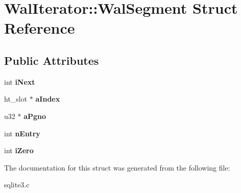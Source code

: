 \hypertarget{struct_wal_iterator_1_1_wal_segment}{\section{Wal\-Iterator\-:\-:Wal\-Segment Struct Reference}
\label{struct_wal_iterator_1_1_wal_segment}
}
\subsection*{Public Attributes}
\begin{DoxyCompactItemize}
\item 
\hypertarget{struct_wal_iterator_1_1_wal_segment_a329c939b196f907fe98cf762bb07d291}{int {\bfseries i\-Next}}\label{struct_wal_iterator_1_1_wal_segment_a329c939b196f907fe98cf762bb07d291}

\item 
\hypertarget{struct_wal_iterator_1_1_wal_segment_adec397836a127acafcc551cb1fdcd851}{ht\-\_\-slot $\ast$ {\bfseries a\-Index}}\label{struct_wal_iterator_1_1_wal_segment_adec397836a127acafcc551cb1fdcd851}

\item 
\hypertarget{struct_wal_iterator_1_1_wal_segment_a5e43273a11dc5856934834c0cdf7f198}{u32 $\ast$ {\bfseries a\-Pgno}}\label{struct_wal_iterator_1_1_wal_segment_a5e43273a11dc5856934834c0cdf7f198}

\item 
\hypertarget{struct_wal_iterator_1_1_wal_segment_ad80cf479aa670eda7aa1adee607af7d9}{int {\bfseries n\-Entry}}\label{struct_wal_iterator_1_1_wal_segment_ad80cf479aa670eda7aa1adee607af7d9}

\item 
\hypertarget{struct_wal_iterator_1_1_wal_segment_a3eedec5e8e8dd94be670d50ac144a959}{int {\bfseries i\-Zero}}\label{struct_wal_iterator_1_1_wal_segment_a3eedec5e8e8dd94be670d50ac144a959}

\end{DoxyCompactItemize}


The documentation for this struct was generated from the following file\-:\begin{DoxyCompactItemize}
\item 
sqlite3.\-c\end{DoxyCompactItemize}

